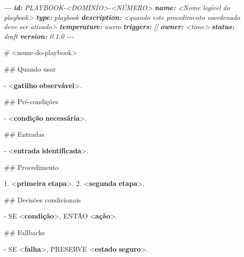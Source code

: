 \documentclass[
  10pt,
  a4paper,
  oneside]{book}
\newenvironment{Shaded}{}{}
\newcommand{\AnnotationTok}[1]{\textcolor[rgb]{0.38,0.63,0.69}{\textbf{\textit{#1}}}}
\newcommand{\CommentTok}[1]{\textcolor[rgb]{0.38,0.63,0.69}{\textit{#1}}}
\newcommand{\DataTypeTok}[1]{\textcolor[rgb]{0.56,0.13,0.00}{#1}}
\newcommand{\ErrorTok}[1]{\textcolor[rgb]{1.00,0.00,0.00}{\textbf{#1}}}
\newcommand{\FunctionTok}[1]{\textcolor[rgb]{0.02,0.16,0.49}{#1}}
\newcommand{\KeywordTok}[1]{\textcolor[rgb]{0.00,0.44,0.13}{\textbf{#1}}}
\newcommand{\NormalTok}[1]{#1}
\newcommand{\SpecialStringTok}[1]{\textcolor[rgb]{0.73,0.40,0.53}{#1}}
\begin{document}
\begin{Shaded}
\begin{Highlighting}[]
\CommentTok{{-}{-}{-}}
\AnnotationTok{id:}\CommentTok{ PLAYBOOK{-}\textless{}DOMINIO\textgreater{}{-}\textless{}NÚMERO\textgreater{}}
\AnnotationTok{name:}\CommentTok{ \textless{}Nome legível do playbook\textgreater{}}
\AnnotationTok{type:}\CommentTok{ playbook}
\AnnotationTok{description:}\CommentTok{ \textless{}quando este procedimento coordenado deve ser ativado\textgreater{}}
\AnnotationTok{temperature:}\CommentTok{ warm}
\AnnotationTok{triggers:}\CommentTok{ []}
\AnnotationTok{owner:}\CommentTok{ \textless{}time\textgreater{}}
\AnnotationTok{status:}\CommentTok{ draft}
\AnnotationTok{version:}\CommentTok{ 0.1.0}
\CommentTok{{-}{-}{-}}

\FunctionTok{\# \textless{}nome{-}do{-}playbook\textgreater{}}

\FunctionTok{\#\# Quando usar}

\SpecialStringTok{{-} }\DataTypeTok{\textless{}}\KeywordTok{gatilho} \ErrorTok{observável}\DataTypeTok{\textgreater{}}\NormalTok{.}

\FunctionTok{\#\# Pré{-}condições}

\SpecialStringTok{{-} }\DataTypeTok{\textless{}}\KeywordTok{condição} \ErrorTok{necessária}\DataTypeTok{\textgreater{}}\NormalTok{.}

\FunctionTok{\#\# Entradas}

\SpecialStringTok{{-} }\DataTypeTok{\textless{}}\KeywordTok{entrada} \ErrorTok{identificada}\DataTypeTok{\textgreater{}}\NormalTok{.}

\FunctionTok{\#\# Procedimento}

\SpecialStringTok{1. }\DataTypeTok{\textless{}}\KeywordTok{primeira} \ErrorTok{etapa}\DataTypeTok{\textgreater{}}\NormalTok{.}
\SpecialStringTok{2. }\DataTypeTok{\textless{}}\KeywordTok{segunda} \ErrorTok{etapa}\DataTypeTok{\textgreater{}}\NormalTok{.}

\FunctionTok{\#\# Decisões condicionais}

\SpecialStringTok{{-} }\NormalTok{SE }\DataTypeTok{\textless{}}\KeywordTok{condição}\DataTypeTok{\textgreater{}}\NormalTok{, ENTÃO }\DataTypeTok{\textless{}}\KeywordTok{ação}\DataTypeTok{\textgreater{}}\NormalTok{.}

\FunctionTok{\#\# Fallbacks}

\SpecialStringTok{{-} }\NormalTok{SE }\DataTypeTok{\textless{}}\KeywordTok{falha}\DataTypeTok{\textgreater{}}\NormalTok{, PRESERVE }\DataTypeTok{\textless{}}\KeywordTok{estado} \ErrorTok{seguro}\DataTypeTok{\textgreater{}}\NormalTok{.}


\end{Highlighting}
\end{Shaded}
\end{document}
